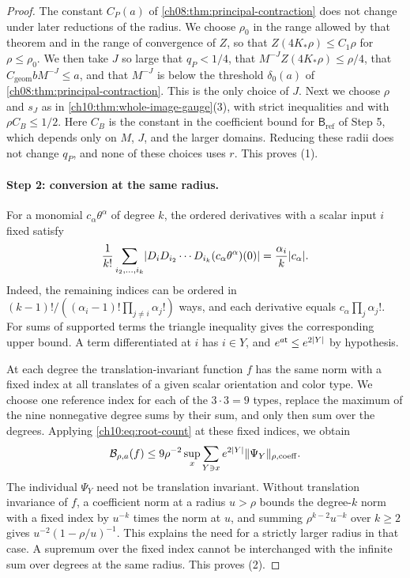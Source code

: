 \begin{proof}
The constant $C_P(a)$ of \cref{ch08:thm:principal-contraction} does not change under later reductions of the radius. We choose $\rho_0$ in the range allowed by that theorem and in the range of convergence of $Z$, so that $Z(4K_*\rho)\le C_1\rho$ for $\rho\le\rho_0$. We then take $J$ so large that $q_P<1/4$, that $M^{-J}Z(4K_*\rho)\le\rho/4$, that $C_{\mathrm{geom}}bM^{-J}\le a$, and that $M^{-J}$ is below the threshold $\delta_0(a)$ of \cref{ch08:thm:principal-contraction}. This is the only choice of $J$. Next we choose $\rho$ and $s_J$ as in \cref{ch10:thm:whole-image-gauge}(3), with strict inequalities and with $\rho C_B\le1/2$. Here $C_B$ is the constant in the coefficient bound for $\mathsf B_{\mathrm{ref}}$ of Step 5, which depends only on $M$, $J$, and the larger domains. Reducing these radii does not change $q_P$, and none of these choices uses $r$. This proves (1).

\paragraph{Step 2: conversion at the same radius.}
For a monomial $c_\alpha\theta^\alpha$ of degree $k$, the ordered derivatives with a scalar input $i$ fixed satisfy
\begin{equation}\label{ch10:eq:root-count}
 \frac1{k!}\sum_{i_2,\ldots,i_k}\lvert D_iD_{i_2}\cdots D_{i_k}(c_\alpha\theta^\alpha)(0)\rvert=\frac{\alpha_i}k\lvert c_\alpha\rvert.
\end{equation}
Indeed, the remaining indices can be ordered in $(k-1)!/((\alpha_i-1)!\prod_{j\ne i}\alpha_j!)$ ways, and each derivative equals $c_\alpha\prod_j\alpha_j!$. For sums of supported terms the triangle inequality gives the corresponding upper bound. A term differentiated at $i$ has $i\in Y$, and $e^{a\mathsf t}\le e^{2\lvert Y\rvert}$ by hypothesis.

At each degree the translation-invariant function $f$ has the same norm with a fixed index at all translates of a given scalar orientation and color type. We choose one reference index for each of the $3\cdot3=9$ types, replace the maximum of the nine nonnegative degree sums by their sum, and only then sum over the degrees. Applying \eqref{ch10:eq:root-count} at these fixed indices, we obtain
\[
 \mathcal B_{\rho,a}(f)\le9\rho^{-2}\sup_x\sum_{Y\ni x}e^{2\lvert Y\rvert}\lVert \Psi_Y\rVert_{\rho,\mathrm{coeff}}.
\]
The individual $\Psi_Y$ need not be translation invariant. Without translation invariance of $f$, a coefficient norm at a radius $u>\rho$ bounds the degree-$k$ norm with a fixed index by $u^{-k}$ times the norm at $u$, and summing $\rho^{k-2}u^{-k}$ over $k\ge2$ gives $u^{-2}(1-\rho/u)^{-1}$. This explains the need for a strictly larger radius in that case. A supremum over the fixed index cannot be interchanged with the infinite sum over degrees at the same radius. This proves (2).


\end{proof}
